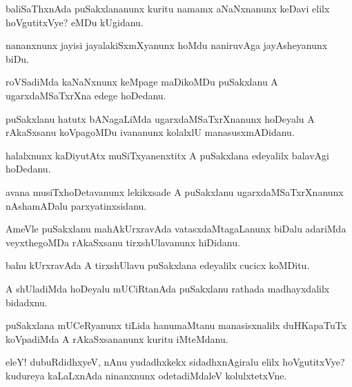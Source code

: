 \documentclass{article}
\begin{document}
\begin{mn}%
baliSaThxnAda puSakxlananunx kuritu namamx aNaNxnanunx keDavi elilx hoVgutitxVye? eMDu  
kUgidanu.
\end{mn}

\begin{mn}%
nananxnunx jayisi jayalakiSxmXyanunx hoMdu naniruvAga jayAsheyanunx biDu.
\end{mn}

\begin{mn}%
roVSadiMda kaNaNxnunx keMpage maDikoMDu puSakxlanu A ugarxdaMSaTxrXna edege hoDedanu.
\end{mn}

\begin{mn}%
puSakxlanu hatutx bANagaLiMda ugarxdaMSaTxrXnanunx hoDeyalu A rAkaSxsanu koVpagoMDu 
ivananunx kolalxlU manasusxmADidanu.
\end{mn}

\begin{mn}%
halalxnunx kaDiyutAtx muSiTxyanenxtitx A puSakxlana edeyalilx balavAgi hoDedanu.
\end{mn}

\begin{mn}%
avana musiTxhoDetavanunx lekikxsade A puSakxlanu ugarxdaMSaTxrXnanunx nAshamADalu 
parxyatinxsidanu.
\end{mn}

\begin{mn}%
AmeVle puSakxlanu mahAkUrxravAda vatasxdaMtagaLanunx biDalu adariMda veyxthegoMDa 
rAkaSxsanu tirxshUlavanunx hiDidanu.
\end{mn}

\begin{mn}%
bahu kUrxravAda A tirxshUlavu puSakxlana edeyalilx cucicx koMDitu.
\end{mn}

\begin{mn}%
A shUladiMda hoDeyalu mUCiRtanAda puSakxlanu rathada madhayxdalilx bidadxnu.
\end{mn}

\begin{mn}%
puSakxlana mUCeRyanunx tiLida hanumaMtanu manasisxnalilx duHKapaTuTx koVpadiMda A 
rAkaSxsananunx kuritu iMteMdanu.
\end{mn}

\begin{mn}%
eleY! dubuRdidhxyeV, nAnu yudadhxkekx sidadhxnAgiralu elilx hoVgutitxVye? kudureya 
kaLaLxnAda ninanxnunx odetadiMdaleV kolulxtetxVne.
\end{mn}
\end{document}
